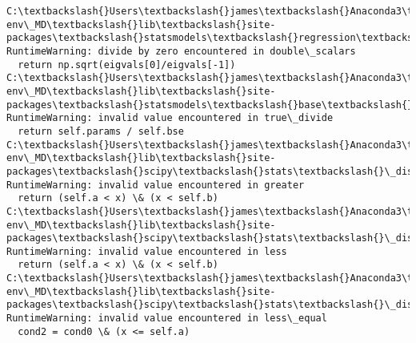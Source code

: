 \documentclass[11pt]{article}
\begin{document}
    \begin{Verbatim}[commandchars=\\\{\}]
C:\textbackslash{}Users\textbackslash{}james\textbackslash{}Anaconda3\textbackslash{}envs\textbackslash{}learn-env\_MD\textbackslash{}lib\textbackslash{}site-packages\textbackslash{}statsmodels\textbackslash{}regression\textbackslash{}linear\_model.py:1633: RuntimeWarning: divide by zero encountered in double\_scalars
  return np.sqrt(eigvals[0]/eigvals[-1])
C:\textbackslash{}Users\textbackslash{}james\textbackslash{}Anaconda3\textbackslash{}envs\textbackslash{}learn-env\_MD\textbackslash{}lib\textbackslash{}site-packages\textbackslash{}statsmodels\textbackslash{}base\textbackslash{}model.py:1100: RuntimeWarning: invalid value encountered in true\_divide
  return self.params / self.bse
C:\textbackslash{}Users\textbackslash{}james\textbackslash{}Anaconda3\textbackslash{}envs\textbackslash{}learn-env\_MD\textbackslash{}lib\textbackslash{}site-packages\textbackslash{}scipy\textbackslash{}stats\textbackslash{}\_distn\_infrastructure.py:877: RuntimeWarning: invalid value encountered in greater
  return (self.a < x) \& (x < self.b)
C:\textbackslash{}Users\textbackslash{}james\textbackslash{}Anaconda3\textbackslash{}envs\textbackslash{}learn-env\_MD\textbackslash{}lib\textbackslash{}site-packages\textbackslash{}scipy\textbackslash{}stats\textbackslash{}\_distn\_infrastructure.py:877: RuntimeWarning: invalid value encountered in less
  return (self.a < x) \& (x < self.b)
C:\textbackslash{}Users\textbackslash{}james\textbackslash{}Anaconda3\textbackslash{}envs\textbackslash{}learn-env\_MD\textbackslash{}lib\textbackslash{}site-packages\textbackslash{}scipy\textbackslash{}stats\textbackslash{}\_distn\_infrastructure.py:1831: RuntimeWarning: invalid value encountered in less\_equal
  cond2 = cond0 \& (x <= self.a)

    \end{Verbatim}
\end{document}
